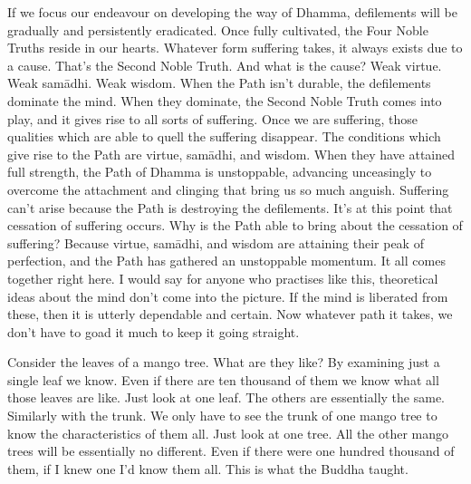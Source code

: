 If we focus our endeavour on developing the way of Dhamma, defilements will be gradually and persistently eradicated. Once fully cultivated, the Four Noble Truths reside in our hearts. Whatever form suffering takes, it always exists due to a cause. That's the Second Noble Truth. And what is the cause? Weak virtue. Weak sam\=adhi. Weak wisdom. When the Path isn't durable, the defilements dominate the mind. When they dominate, the Second Noble Truth comes into play, and it gives rise to all sorts of suffering. Once we are suffering, those qualities which are able to quell the suffering disappear. The conditions which give rise to the Path are virtue, sam\=adhi, and wisdom. When they have attained full strength, the Path of Dhamma is unstoppable, advancing unceasingly to overcome the attachment and clinging that bring us so much anguish. Suffering can't arise because the Path is destroying the defilements. It's at this point that cessation of suffering occurs. Why is the Path able to bring about the cessation of suffering? Because virtue, sam\=adhi, and wisdom are attaining their peak of perfection, and the Path has gathered an unstoppable momentum. It all comes together right here. I would say for anyone who practises like this, theoretical ideas about the mind don't come into the picture. If the mind is liberated from these, then it is utterly dependable and certain. Now whatever path it takes, we don't have to goad it much to keep it going straight.

Consider the leaves of a mango tree. What are they like? By examining just a single leaf we know. Even if there are ten thousand of them we know what all those leaves are like. Just look at one leaf. The others are essentially the same. Similarly with the trunk. We only have to see the trunk of one mango tree to know the characteristics of them all. Just look at one tree. All the other mango trees will be essentially no different. Even if there were one hundred thousand of them, if I knew one I'd know them all. This is what the Buddha taught.

